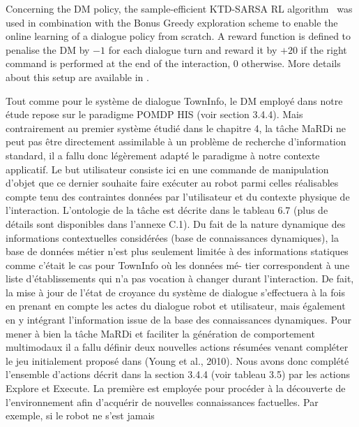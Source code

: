 \documentclass[a4paper,11pt,twoside]{StyleThese}
\begin{document}
Concerning the DM policy, the sample-efficient KTD-SARSA RL algorithm~\cite{Daubigney12} was used in combination with the Bonus Greedy exploration scheme to enable the online learning of a dialogue policy from scratch. A reward function is defined to penalise the DM by $-1$ for each dialogue turn and reward it by $+20$ if the right command is performed at the end of the interaction, $0$ otherwise. More details about this setup are available in \cite{Ferreira13a,Ferreira13b}.

Tout comme pour le système de dialogue TownInfo, le DM employé dans notre étude
repose sur le paradigme POMDP HIS (voir section 3.4.4). Mais contrairement au premier
système étudié dans le chapitre 4, la tâche MaRDi ne peut pas être directement
assimilable à un problème de recherche d’information standard, il a fallu donc légèrement
adapté le paradigme à notre contexte applicatif.
Le but utilisateur consiste ici en une commande de manipulation d’objet que ce dernier
souhaite faire exécuter au robot parmi celles réalisables compte tenu des contraintes
données par l’utilisateur et du contexte physique de l’interaction. L’ontologie de la
tâche est décrite dans le tableau 6.7 (plus de détails sont disponibles dans l’annexe C.1).
Du fait de la nature dynamique des informations contextuelles considérées (base
de connaissances dynamiques), la base de données métier n’est plus seulement limitée
à des informations statiques comme c’était le cas pour TownInfo où les données mé-
tier correspondent à une liste d’établissements qui n’a pas vocation à changer durant
l’interaction. De fait, la mise à jour de l’état de croyance du système de dialogue s’effectuera
à la fois en prenant en compte les actes du dialogue robot et utilisateur, mais
également en y intégrant l’information issue de la base des connaissances dynamiques.
Pour mener à bien la tâche MaRDi et faciliter la génération de comportement multimodaux
il a fallu définir deux nouvelles actions résumées venant compléter le jeu
initialement proposé dans (Young et al., 2010). Nous avons donc complété l’ensemble
d’actions décrit dans la section 3.4.4 (voir tableau 3.5) par les actions Explore et Execute.
La première est employée pour procéder à la découverte de l’environnement afin d’acquérir
de nouvelles connaissances factuelles. Par exemple, si le robot ne s’est jamais
\end{document}
